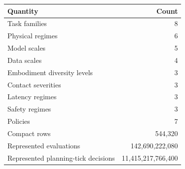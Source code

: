 \begin{tabular}{lr}
\toprule
Quantity & Count \\
\midrule
Task families & 8 \\
Physical regimes & 6 \\
Model scales & 5 \\
Data scales & 4 \\
Embodiment diversity levels & 3 \\
Contact severities & 3 \\
Latency regimes & 3 \\
Safety regimes & 3 \\
Policies & 7 \\
Compact rows & 544,320 \\
Represented evaluations & 142,690,222,080 \\
Represented planning-tick decisions & 11,415,217,766,400 \\
\bottomrule
\end{tabular}
